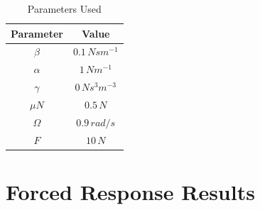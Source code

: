 \documentclass[12pt]{article}
\begin{document}
\begin{table}[!h]
  \centering
  \caption{Parameters Used}
  \begin{tabular}[t]{c|c}
    \hline\hline
    \textbf{Parameter} & \textbf{Value}\\\hline
    $\beta$ & $0.1\,Ns m^{-1}$\\
    $\alpha$ & $1\, N m^{-1}$\\
    $\gamma$ & $0\, Ns^3 m^{-3}$\\
    $\mu N$ & $0.5\, N$\\
    $\Omega$ & $0.9\, rad/s$\\
    $F$ & $10\, N$\\
    \hline\hline
  \end{tabular}
\end{table}

\pagebreak
\section{Forced Response Results}
\label{sec:forc-resp-results}
\end{document}
